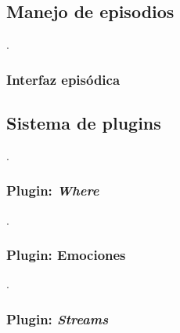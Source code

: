 
\subsection{Manejo de episodios}
.

\subsubsection{Interfaz episódica}

\subsection{Sistema de plugins}
.

\subsubsection{Plugin: \textit{Where}}
.

\subsubsection{Plugin: Emociones}

.

\subsubsection{Plugin: \textit{Streams}}

